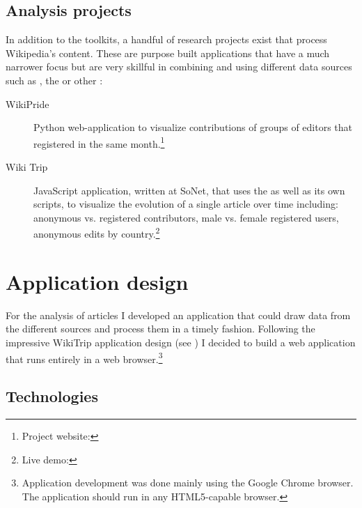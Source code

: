 \subsection{Analysis projects}\label{sub:analysisprojects}

In addition to the toolkits, a handful of research projects exist that process Wikipedia's content.
These are purpose built applications that have a much narrower focus but are very skillful in combining and using different data sources such as , the  or other :

\begin{description}
\item[WikiPride] Python web-application  to visualize contributions of groups of editors that registered in the same month.\footnote{Project website: }
\item[Wiki Trip] JavaScript application, written at SoNet, that uses the  as well as its own  scripts, to visualize the evolution of a single article over time including: anonymous vs. registered contributors, male vs. female registered users, anonymous edits by country.\footnote{Live demo: } 
\end{description}


\section{Application design}\label{sec:application}

For the analysis of articles I developed an application that could draw data from the different sources and process them in a timely fashion.
Following the impressive WikiTrip application design (see ) I decided to build a web application that runs entirely in a web browser.\footnote{Application development was done mainly using the Google Chrome browser. The application should run in any \ac{HTML}5-capable browser.}

\subsection{Technologies}

